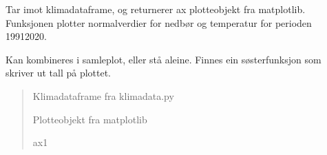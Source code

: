 \documentclass[letterpaper,10pt,norsk]{sphinxmanual}
\begin{document}
\begin{fulllineitems}
\label{\detokenize{index:klimadata.plot.plot_normaler}}
\pysigstartsignatures
{}
\pysigstopsignatures
\sphinxAtStartPar
Tar imot klimadataframe, og returnerer ax plotteobjekt fra matplotlib.
Funksjonen plotter normalverdier for nedbør og temperatur for perioden 1991\sphinxhyphen{}2020.

\sphinxAtStartPar
Kan kombineres i samleplot, eller stå aleine.
Finnes ein søsterfunksjon som skriver ut tall på plottet.
\begin{quote}\begin{description}
\sphinxAtStartPar
{} \textendash{} Klimadataframe fra klimadata.py

\sphinxAtStartPar
Plotteobjekt fra matplotlib

\sphinxAtStartPar
ax1

\end{description}\end{quote}

\end{fulllineitems}

\end{document}
